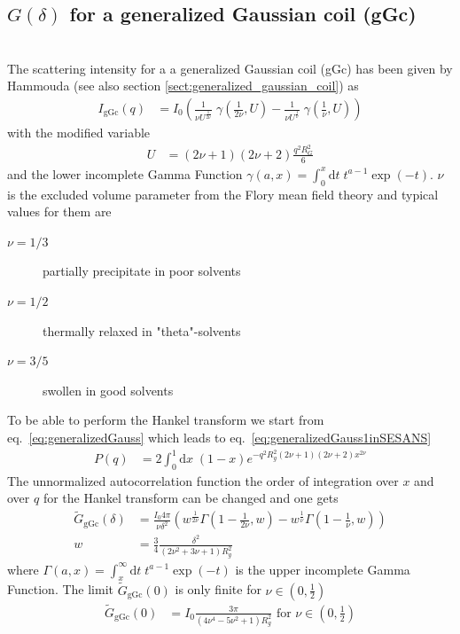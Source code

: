 \subsection{$G(\delta)$ for a generalized Gaussian coil (gGc) }~\\
\label{sec:Gz_gGc}
The scattering intensity for a a generalized Gaussian coil (gGc) has been given by  Hammouda \cite{Hammouda,Hammouda2012,Hammouda1993,Hammouda2016} (see also section \ref{sect:generalized_gaussian_coil}) as
\begin{align}
I_\text{gGc}(q) &= I_0
\left(
\frac{1}{\nu U^{\frac{1}{2 \nu}}} \; \gamma\left(\frac{1}{2 \nu},U\right)-
\frac{1}{\nu U^{\frac{1}{  \nu}}} \; \gamma\left(\frac{1}{  \nu},U\right)
\right)
\label{eq:generalizedGauss1inSESANS}
\end{align}
with the modified variable
\begin{align}
U&= \left(2\nu+1\right)\left(2\nu+2\right)\frac{q^2R_G^2}{6}
\end{align}
and the lower incomplete Gamma Function $\gamma(a,x) = \int_0^x \mathrm{d}t \; t^{a-1} \exp(-t)$.
$\nu$ is the excluded volume parameter from the Flory mean field theory and typical values for them are
\begin{description}
\item[$\nu=1/3$] partially precipitate in poor solvents
\item[$\nu=1/2$] thermally relaxed in "theta"-solvents
\item[$\nu=3/5$] swollen in good solvents
\end{description}
To be able to perform the Hankel transform we start from eq.\ \ref{eq:generalizedGauss} which leads to eq.\ \ref{eq:generalizedGauss1inSESANS}
\begin{align}
P(q) &= 2\int_0^1 \mathrm{d}x \; (1-x)e^{-q^2R_g^2(2\nu+1)(2\nu+2)x^{2\nu}}
\label{eq:generalizedGaussinSESANS}
\end{align}
The unnormalized autocorrelation function the order of integration over $x$ and  over $q$ for the Hankel transform can be changed and one gets
\begin{align}
\tilde{G}_\mathrm{gGc}(\delta) &=
 \frac{I_0 4\pi}{\nu \delta^2} \left(
   w^{\frac{1}{2\nu}} \Gamma \left(1-\frac{1}{2 \nu },w\right) - w^{\frac{1}{\nu }} \Gamma \left(1-\frac{1}{\nu },w\right) \right)\\
   w &= \frac34 \frac{\delta^2}{\left(2 \nu ^2+3 \nu +1\right) R_g^2}
\end{align}
where $\Gamma(a,x) = \int_x^\infty \mathrm{d}t \; t^{a-1} \exp(-t)$ is the upper incomplete Gamma Function.
The limit $\tilde{G}_\mathrm{gGc}(0)$ is only finite for $\nu \in \left(0,\frac12\right)$
\begin{align}
\tilde{G}_\mathrm{gGc}(0) &= I_0 \frac{3 \pi }{\left(4 \nu ^4-5 \nu ^2+1\right) R_g^2} \mbox{~for~} \nu \in \left(0,\frac12\right)
\end{align}

